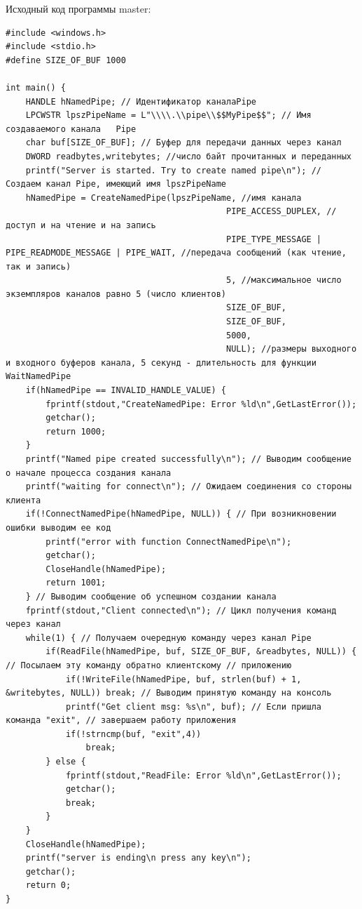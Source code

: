 \documentclass[a4paper]{article}
\begin{document}
	Исходный код программы master:
	\begin{lstlisting}[style=crs_cpp]
#include <windows.h>
#include <stdio.h>
#define SIZE_OF_BUF 1000 

int main() { 
	HANDLE hNamedPipe; // Идентификатор каналаPipe 
	LPCWSTR lpszPipeName = L"\\\\.\\pipe\\$$MyPipe$$"; // Имя создаваемого канала 	Pipe
	char buf[SIZE_OF_BUF]; // Буфер для передачи данных через канал
	DWORD readbytes,writebytes; //число байт прочитанных и переданных 
	printf("Server is started. Try to create named pipe\n"); // Создаем канал Pipe, имеющий имя	lpszPipeName
	hNamedPipe = CreateNamedPipe(lpszPipeName, //имя канала
											PIPE_ACCESS_DUPLEX, //доступ и на чтение и на запись 
											PIPE_TYPE_MESSAGE | PIPE_READMODE_MESSAGE | PIPE_WAIT, //передача сообщений (как чтение, так и запись) 
											5, //максимальное число экземпляров каналов равно 5 (число клиентов) 
											SIZE_OF_BUF, 
											SIZE_OF_BUF, 
											5000,
											NULL); //размеры выходного и входного буферов канала, 5 секунд - длительность для функции WaitNamedPipe 
	if(hNamedPipe == INVALID_HANDLE_VALUE) { 
		fprintf(stdout,"CreateNamedPipe: Error %ld\n",GetLastError());
		getchar();
		return 1000;
	} 
	printf("Named pipe created successfully\n"); // Выводим сообщение о начале процесса создания канала
	printf("waiting for connect\n"); // Ожидаем соединения со стороны клиента
	if(!ConnectNamedPipe(hNamedPipe, NULL)) { // При возникновении ошибки выводим ее код 
		printf("error with function ConnectNamedPipe\n"); 
		getchar(); 
		CloseHandle(hNamedPipe);
		return 1001; 
	} // Выводим сообщение об успешном создании канала 
	fprintf(stdout,"Client connected\n"); // Цикл получения команд через канал
	while(1) { // Получаем очередную команду через канал Pipe 
		if(ReadFile(hNamedPipe, buf, SIZE_OF_BUF, &readbytes, NULL)) { // Посылаем эту команду обратно клиентскому // приложению 
			if(!WriteFile(hNamedPipe, buf, strlen(buf) + 1, &writebytes, NULL)) break; // Выводим принятую команду на консоль 
			printf("Get client msg: %s\n", buf); // Если пришла команда "exit", // завершаем работу приложения
			if(!strncmp(buf, "exit",4))
				break;
		} else { 
			fprintf(stdout,"ReadFile: Error %ld\n",GetLastError()); 
			getchar(); 
			break; 
		} 
	} 
	CloseHandle(hNamedPipe); 
	printf("server is ending\n press any key\n"); 
	getchar();
	return 0; 
}
	\end{lstlisting}
	
\end{document}
